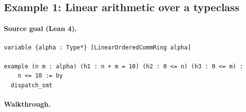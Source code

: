 \documentclass[11pt,letterpaper]{article}
\theoremstyle{definition}
\theoremstyle{remark}
\begin{document}
\subsection{Example 1: Linear arithmetic over a typeclass}
\label{sec:example1}

\paragraph{Source goal (Lean 4).}

\begin{lstlisting}[style=lean]
variable {alpha : Type*} [LinearOrderedCommRing alpha]

example (n m : alpha) (h1 : n + m = 10) (h2 : 0 <= n) (h3 : 0 <= m) :
    n <= 10 := by
  dispatch_smt
\end{lstlisting}

\paragraph{Walkthrough.}
\end{document}
